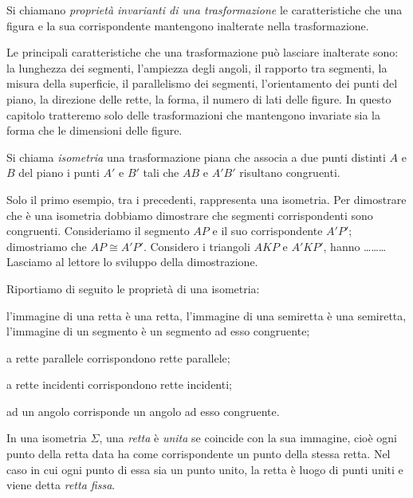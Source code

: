 \begin{definizione}
Si chiamano \emph{proprietà invarianti di una trasformazione} le 
caratteristiche che una figura e la sua corrispondente mantengono 
inalterate nella trasformazione.
\end{definizione}

Le principali caratteristiche che una trasformazione può lasciare 
inalterate sono: la lunghezza dei segmenti, l'ampiezza degli angoli, 
il rapporto tra segmenti, la misura della superficie, il parallelismo 
dei segmenti, l'orientamento dei punti del piano, la direzione delle 
rette, la forma, il numero di lati delle figure.
In questo capitolo tratteremo solo delle trasformazioni che 
mantengono invariate sia la forma che le dimensioni delle figure.

\begin{definizione}
Si chiama \emph{isometria} una trasformazione piana che associa a due 
punti distinti \(A\) e \(B\) del piano i punti \(A'\) e \(B'\) tali che \(AB\) 
e \(A'B'\) risultano congruenti.
\end{definizione}

Solo il primo esempio, tra i precedenti, rappresenta una isometria. 
Per dimostrare che è una isometria dobbiamo dimostrare che segmenti 
corrispondenti sono congruenti. Consideriamo il segmento \(AP\) e il 
suo corrispondente \(A'P'\); dimostriamo che \(AP\cong A'P'\). Considero 
i triangoli \(AKP\) e \(A'KP'\), hanno \ldots\ldots\ldots{}
Lasciamo al lettore lo sviluppo della dimostrazione.

Riportiamo di seguito le proprietà di una isometria:
\begin{itemize*}
\item l'immagine di una retta è una retta, l'immagine di una 
semiretta è una semiretta, l'immagine di un segmento è un segmento ad 
esso congruente;
\item a rette parallele corrispondono rette parallele;
\item a rette incidenti corrispondono rette incidenti;
\item ad un angolo corrisponde un angolo ad esso congruente.
\end{itemize*}

\begin{definizione}
In una isometria \(\Sigma\), una \emph{retta} è \emph{unita} se 
coincide con la sua immagine, cioè ogni punto della retta data ha 
come corrispondente un punto della stessa retta.
Nel caso in cui ogni punto di essa sia un punto unito, la retta è 
luogo di punti uniti e viene detta \emph{retta fissa}.
\end{definizione}

